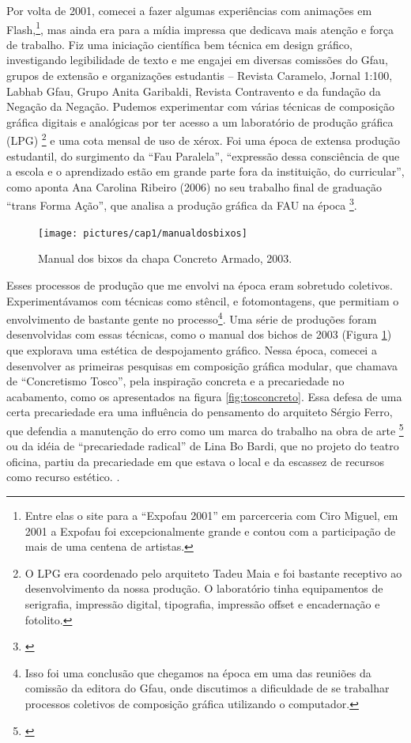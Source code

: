  Por volta de 2001, comecei a fazer algumas experiências com animações em Flash,\footnote{Entre elas o site para a ``Expofau 2001'' em parcerceria com Ciro Miguel, em 2001 a Expofau foi excepcionalmente grande e contou com a participação de mais de uma centena de artistas.}, mas ainda era para a mídia impressa que dedicava mais atenção e força de trabalho. Fiz uma iniciação científica bem técnica em design gráfico, investigando legibilidade de texto  e me engajei em diversas comissões do Gfau, grupos de extensão e organizações estudantis – Revista Caramelo, Jornal 1:100, Labhab Gfau, Grupo Anita Garibaldi, Revista Contravento e da fundação da Negação da Negação. Pudemos experimentar com várias técnicas de composição gráfica digitais e analógicas por ter acesso a um laboratório de produção gráfica (LPG) \footnote{O LPG era coordenado pelo arquiteto Tadeu Maia e foi bastante receptivo ao desenvolvimento da nossa produção. O laboratório tinha equipamentos de serigrafia, impressão digital, tipografia, impressão offset e encadernação e fotolito.} e uma cota mensal de uso de xérox. Foi uma época de extensa produção estudantil, do surgimento da ``Fau Paralela'', ``expressão dessa consciência de que a escola e o aprendizado estão em grande parte fora da instituição, do curricular'', como aponta Ana Carolina Ribeiro (2006) no seu trabalho final de graduação ``trans Forma Ação'', que analisa a produção gráfica da FAU na época \footnote{\cite{Ribeiro2006}}. 

\begin{figure}

\texttt{[image: pictures/cap1/manualdosbixos]}
\caption{Manual dos bixos da chapa Concreto Armado, 2003.}
\label{fig:bichos}
\end{figure}

Esses processos de produção que me envolvi na época eram sobretudo coletivos. Experimentávamos com técnicas como stêncil, e fotomontagens, que permitiam o envolvimento de bastante gente no processo\footnote{Isso foi uma conclusão que chegamos na época em uma das reuniões da comissão da editora do Gfau, onde discutimos a dificuldade de se trabalhar processos coletivos de composição gráfica utilizando o computador.}. Uma série de produções foram desenvolvidas com essas técnicas, como o manual dos bichos de 2003 (Figura \ref{fig:bichos}) que explorava uma estética de despojamento gráfico. Nessa época, comecei a desenvolver as primeiras pesquisas em composição gráfica modular, que chamava de ``Concretismo Tosco'', pela inspiração concreta e a precariedade no acabamento, como os apresentados na figura \ref{fig:tosconcreto}. Essa defesa de uma certa precariedade era uma influência do pensamento do arquiteto Sérgio Ferro, que defendia a manutenção do erro como um marca do trabalho na obra de arte \footnote{\cite{FerroSergio2002}} ou da idéia de ``precariedade radical'' de Lina Bo Bardi, que no projeto do teatro oficina, partiu da precariedade em que estava o local e da escassez de recursos como recurso estético.  \cite{Macedo2015}. 


